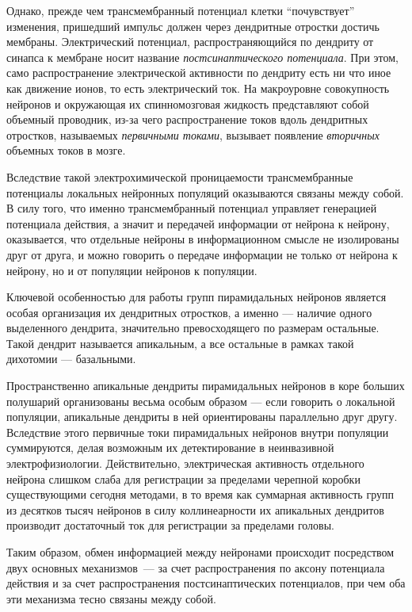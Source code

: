 Однако, прежде чем трансмембранный потенциал клетки ``почувствует''
изменения, пришедший импульс должен через дендритные отростки достичь мембраны.
Электрический потенциал, распространяющийся по дендриту от синапса к мембране
носит название \emph{постсинаптического потенциала}. При этом, само распространение
электрической активности по дендриту есть ни что иное как движение ионов, то есть
электрический ток. На макроуровне совокупность нейронов и окружающая их спинномозговая
жидкость представляют собой объемный проводник, из-за чего распространение токов
вдоль дендритных отростков, называемых \emph{первичными токами},
вызывает появление \emph{вторичных} объемных токов в мозге.

Вследствие такой электрохимической проницаемости трансмембранные потенциалы локальных
нейронных популяций оказываются связаны между собой. В силу того, что именно
трансмембранный потенциал управляет генерацией потенциала действия, а значит и
передачей информации от нейрона к нейрону, оказывается, что отдельные нейроны
в информационном смысле не изолированы друг от друга,
и можно говорить о передаче информации не только от нейрона к нейрону,
но и от популяции нейронов к популяции.

Ключевой особенностью для работы групп пирамидальных нейронов является особая организация их
дендритных отростков, а именно --- наличие одного выделенного дендрита,
значительно превосходящего по размерам остальные. Такой дендрит
называется апикальным, а все остальные в рамках такой дихотомии --- базальными.

Пространственно апикальные дендриты пирамидальных нейронов в коре больших полушарий организованы
весьма особым образом --- если говорить о локальной популяции,
апикальные дендриты в ней ориентированы параллельно друг другу. Вследствие этого первичные
токи пирамидальных нейронов внутри популяции суммируются, делая возможным их детектирование
в неинвазивной электрофизиологии. Действительно, электрическая активность отдельного
нейрона слишком слаба для регистрации за пределами черепной коробки существующими сегодня методами,
в то время как  суммарная активность групп из десятков тысяч нейронов
в силу коллинеарности их апикальных дендритов производит достаточный ток для регистрации
за пределами головы.



Таким образом, обмен информацией между нейронами происходит посредством двух основных механизмов~---
за счет распространения по аксону потенциала действия и за счет распространения постсинаптических
потенциалов, при чем оба эти механизма тесно связаны между собой.

